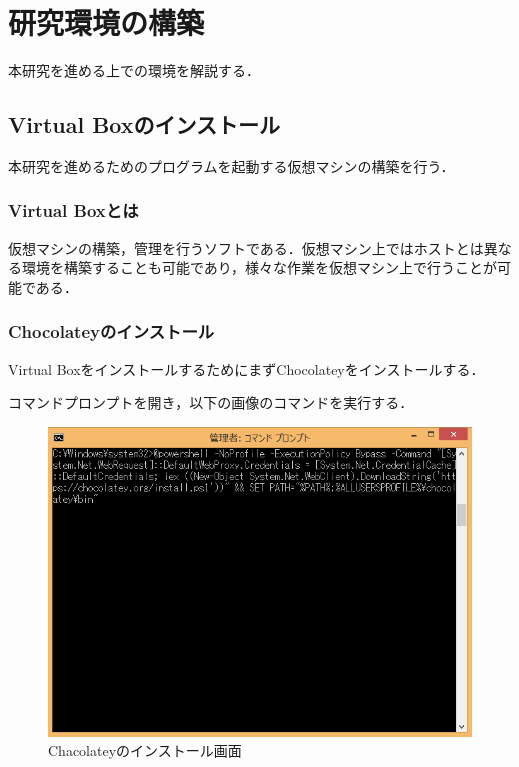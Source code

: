 \newpage


\chapter{研究環境の構築}
本研究を進める上での環境を解説する．

\section{Virtual Boxのインストール}
本研究を進めるためのプログラムを起動する仮想マシンの構築を行う．
\subsection{Virtual Boxとは}
仮想マシンの構築，管理を行うソフトである．仮想マシン上ではホストとは異なる環境を構築することも可能であり，様々な作業を仮想マシン上で行うことが可能である\cite{vb}．

\newpage

\subsection{Chocolateyのインストール}
Virtual BoxをインストールするためにまずChocolateyをインストールする．

コマンドプロンプトを開き，以下の画像のコマンドを実行する．

\begin{figure}[htb]
\centering
\includegraphics[width=15cm]{choco-cmd1.png}
\caption{Chacolateyのインストール画面}\label{chocoinst}
\end{figure}

